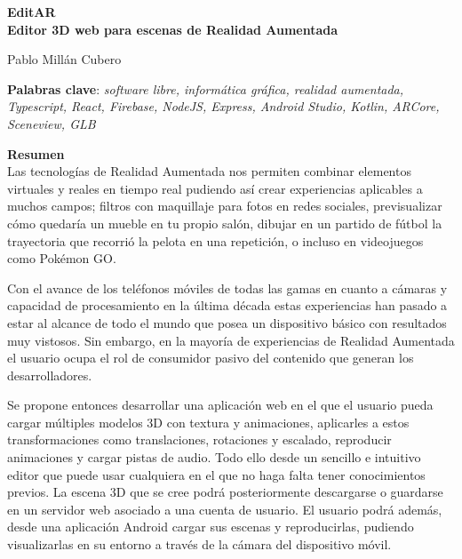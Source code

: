 \thispagestyle{empty}

\begin{center}
{\large\bfseries EditAR \\ Editor 3D web para escenas de Realidad Aumentada }\\
\end{center}
\begin{center}
Pablo Millán Cubero\\
\end{center}


\vspace{0.5cm}
\noindent\textbf{Palabras clave}: \textit{software libre, informática gráfica, realidad aumentada, Typescript, React, Firebase, NodeJS, Express, Android Studio, Kotlin, ARCore, Sceneview, GLB}
\vspace{0.7cm}

\noindent\textbf{Resumen}\\
Las tecnologías de Realidad Aumentada nos permiten combinar elementos virtuales y reales en tiempo real pudiendo así crear experiencias aplicables a muchos campos; filtros con maquillaje para fotos en redes sociales, previsualizar cómo quedaría un mueble en tu propio salón, dibujar en un partido de fútbol la trayectoria que recorrió la pelota en una repetición, o incluso en videojuegos como Pokémon GO.

Con el avance de los teléfonos móviles de todas las gamas en cuanto a cámaras y capacidad de procesamiento en la última década estas experiencias han pasado a estar al alcance de todo el mundo que posea un dispositivo básico con resultados muy vistosos. Sin embargo, en la mayoría de experiencias de Realidad Aumentada el usuario ocupa el rol de consumidor pasivo del contenido que generan los desarrolladores.

Se propone entonces desarrollar una aplicación web en el que el usuario pueda cargar múltiples modelos 3D con textura y animaciones, aplicarles a estos transformaciones como translaciones, rotaciones y escalado, reproducir animaciones y cargar pistas de audio. Todo ello desde un sencillo e intuitivo editor que puede usar cualquiera en el que no haga falta tener conocimientos previos. La escena 3D que se cree podrá posteriormente descargarse o guardarse en un servidor web asociado a una cuenta de usuario. El usuario podrá además, desde una aplicación Android cargar sus escenas y reproducirlas, pudiendo visualizarlas en su entorno a través de la cámara del dispositivo móvil.



